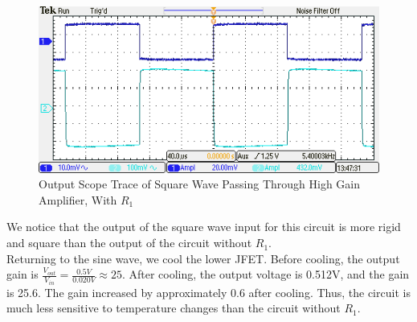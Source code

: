 \documentclass{article}
\begin{document}
    \begin{figure}[H]
        \centering
        \includegraphics[scale = 0.7]{TEK00009.PNG}
        \caption{Output Scope Trace of Square Wave Passing Through High Gain Amplifier, With $R_1$}
        \label{fig:my_label}
    \end{figure}
    We notice that the output of the square wave input for this circuit is more rigid and square than the output of the circuit without $R_1$.
    \\\indent Returning to the sine wave, we cool the lower JFET. Before cooling, the output gain is $\frac{V_{out}}{V_{in}} = \frac{0.5V}{0.020V} \approx 25$. After cooling, the output voltage is 0.512V, and the gain is 25.6. The gain increased by approximately 0.6 after cooling. Thus, the circuit is much less sensitive to temperature changes than the circuit without $R_1$.
\end{document}
